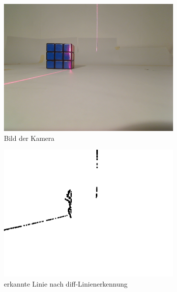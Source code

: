 \documentclass[ngerman,a4paper,parskip=half]{scrartcl}
\begin{document}
\begin{figure}[H]
	\begin{subfigure}{0.32\textwidth}
		\includegraphics[width=\textwidth]{includes/blue_0.png}
		\caption{Bild der Kamera\\}
		\label{fig:blue_0_cam}
	\end{subfigure}
	\hfill
	\begin{subfigure}{0.32\textwidth}
		\includegraphics[width=\textwidth]{includes/blue_0_diff.png}
		\caption{erkannte Linie nach diff-Linienerkennung}
		\label{fig:blue_0_diff}
	\end{subfigure}
	\hfill
	\begin{subfigure}{0.32\textwidth}

\end{subfigure}
\end{figure}
\end{document}
